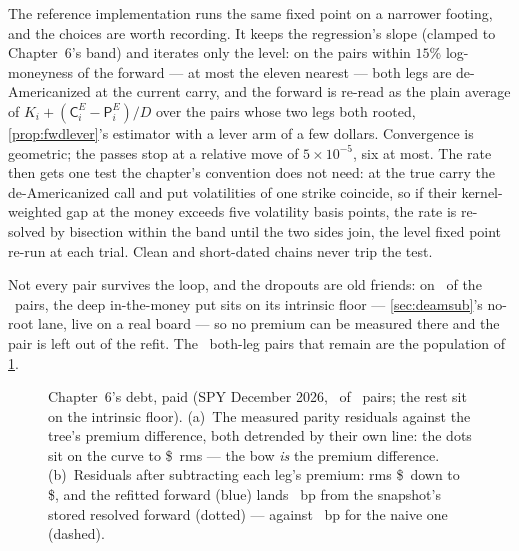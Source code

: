 The reference implementation runs the same fixed point on a
narrower footing, and the choices are worth recording.  It keeps
the regression's slope (clamped to Chapter~6's band) and iterates
only the level: on the pairs within $15\%$ log-moneyness of the
forward --- at most the eleven nearest --- both legs are
de-Americanized at the current carry, and the forward is re-read as
the plain average of $K_i+(\mathsf C^{E}_i-\mathsf P^{E}_i)/D$ over
the pairs whose two legs both rooted, \cref{prop:fwdlever}'s
estimator with a lever arm of a few dollars.  Convergence is
geometric; the passes stop at a relative move of $5\times10^{-5}$,
six at most.  The rate then gets one test the chapter's convention
does not need: at the true carry the de-Americanized call and put
volatilities of one strike coincide, so if their kernel-weighted gap
at the money exceeds five volatility basis points, the rate is
re-solved by bisection within the band until the two sides join, the
level fixed point re-run at each trial.  Clean and short-dated chains
never trip the test.

Not every pair survives the loop, and the dropouts are old friends:
on \MacDeamBowNDropped\ of the \MacDeamBowNPairs\ pairs, the deep
in-the-money put sits on its intrinsic floor --- \cref{sec:deamsub}'s
no-root lane, live on a real board --- so no premium can be measured
there and the pair is left out of the refit.  The
\MacDeamBowNKept\ both-leg pairs that remain are the population of
\cref{fig:deambow}.

\begin{figure}[htbp]
\centering
{}
\caption{Chapter~6's debt, paid (SPY December 2026,
\MacDeamBowNKept\ of \MacDeamBowNPairs\ pairs; the rest sit on the
intrinsic floor).  (a)~The measured parity residuals against the
tree's premium difference, both detrended by their own line: the dots
sit on the curve to \$\MacDeamBowMatchRmsDollars\ rms --- the bow
\emph{is} the premium difference.  (b)~Residuals after subtracting
each leg's premium: rms \$\MacDeamBowRmsBeforeDollars\ down to
\$\MacDeamBowRmsAfterDollars, and the refitted forward (blue) lands
\MacDeamBowGapToResolvedBp\ bp from the snapshot's stored resolved
forward (dotted) --- against \MacDeamBowNaiveGapBp\ bp for the naive
one (dashed).}
\label{fig:deambow}
\end{figure}

